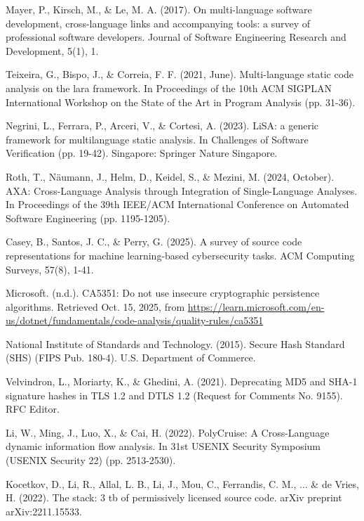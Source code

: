 \documentclass{article}
\begin{document}
\begin{thebibliography}{00}
Mayer, P., Kirsch, M., \& Le, M. A. (2017). On multi-language software development, cross-language links and accompanying tools: a survey of professional software developers. Journal of Software Engineering Research and Development, 5(1), 1.

Teixeira, G., Bispo, J., \& Correia, F. F. (2021, June). Multi-language static code analysis on the lara framework. In Proceedings of the 10th ACM SIGPLAN International Workshop on the State of the Art in Program Analysis (pp. 31-36).

Negrini, L., Ferrara, P., Arceri, V., \& Cortesi, A. (2023). LiSA: a generic framework for multilanguage static analysis. In Challenges of Software Verification (pp. 19-42). Singapore: Springer Nature Singapore.

Roth, T., Näumann, J., Helm, D., Keidel, S., \& Mezini, M. (2024, October). AXA: Cross-Language Analysis through Integration of Single-Language Analyses. In Proceedings of the 39th IEEE/ACM International Conference on Automated Software Engineering (pp. 1195-1205).

Casey, B., Santos, J. C., \& Perry, G. (2025). A survey of source code representations for machine learning-based cybersecurity tasks. ACM Computing Surveys, 57(8), 1-41.

Microsoft. (n.d.). CA5351: Do not use insecure cryptographic persistence algorithms. Retrieved Oct. 15, 2025, from \url{https://learn.microsoft.com/en-us/dotnet/fundamentals/code-analysis/quality-rules/ca5351}

National Institute of Standards and Technology. (2015). Secure Hash Standard (SHS) (FIPS Pub. 180-4). U.S. Department of Commerce.

Velvindron, L., Moriarty, K., \& Ghedini, A. (2021). Deprecating MD5 and SHA-1 signature hashes in TLS 1.2 and DTLS 1.2 (Request for Comments No. 9155). RFC Editor.

Li, W., Ming, J., Luo, X., \& Cai, H. (2022). {PolyCruise}: A {Cross-Language} dynamic information flow analysis. In 31st USENIX Security Symposium (USENIX Security 22) (pp. 2513-2530).

Kocetkov, D., Li, R., Allal, L. B., Li, J., Mou, C., Ferrandis, C. M., ... \& de Vries, H. (2022). The stack: 3 tb of permissively licensed source code. arXiv preprint arXiv:2211.15533.


\end{thebibliography}
\end{document}
